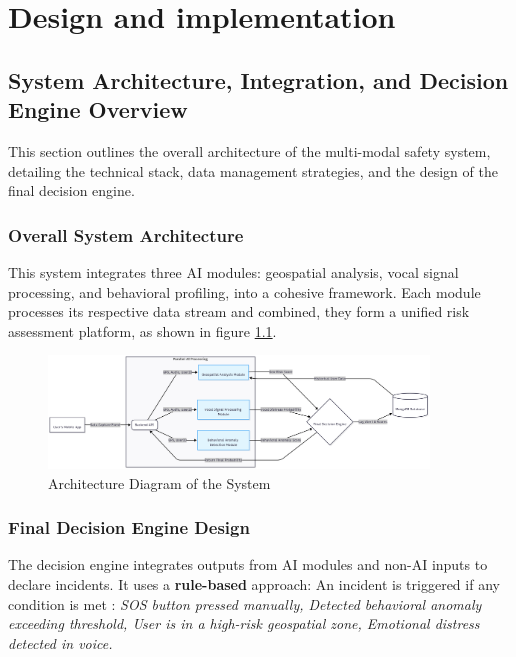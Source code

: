 \documentclass[12pt,a4paper,oneside,english]{book}
\begin{document}



\chapter{Design and implementation}
\label{ch:4eme}
\section{System Architecture, Integration, and Decision Engine Overview}
\label{sec:system_architecture}
This section outlines the overall architecture of the multi-modal safety system, detailing the technical stack, data management strategies, and the design of the final decision engine.
\subsection{Overall System Architecture}
This system integrates three AI modules: geospatial analysis, vocal signal processing, and behavioral profiling, into a cohesive framework. 
Each module processes its respective data stream and combined, they form a unified risk assessment platform, as shown in figure \ref{fig:architecture}.
\begin{figure}[h!] %
    \centering
    \includegraphics[width=0.9\textwidth]{images/diag5.png}
    \caption{Architecture Diagram of the System}
    \label{fig:architecture}
\end{figure}


\subsection{Final Decision Engine Design}
The decision engine integrates outputs from AI modules and non-AI inputs to declare incidents. It uses a \textbf{rule-based} approach: 
An incident is triggered if any condition is met :
\textit{SOS button pressed manually, Detected behavioral anomaly exceeding threshold, User is in a high-risk geospatial zone, Emotional distress detected in voice.}
\end{document}
